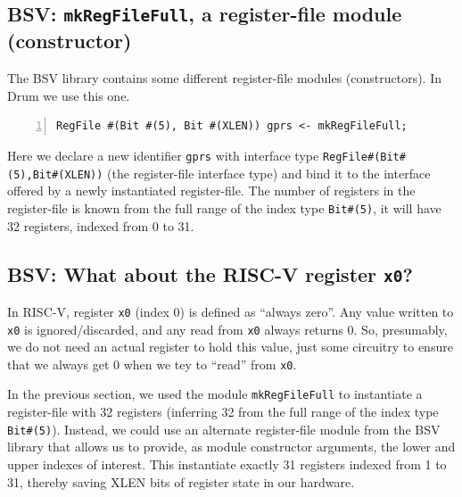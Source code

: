 
\subsection{BSV: {\tt mkRegFileFull}, a register-file module (constructor)}


The BSV library contains some different register-file modules
(constructors). In Drum we use this one.


\begin{Verbatim}[frame=single, numbers=left]
   RegFile #(Bit #(5), Bit #(XLEN)) gprs <- mkRegFileFull;
\end{Verbatim}

Here we declare a new identifier \verb|gprs| with interface type
\verb|RegFile#(Bit#(5),Bit#(XLEN))| (the register-file interface type)
and bind it to the interface offered by a newly instantiated
register-file.  The number of registers in the register-file is known
from the full range of the index type \verb|Bit#(5)|, {\ie} it will
have 32 registers, indexed from 0 to 31.


\subsection{BSV: What about the RISC-V register {\tt x0}?}


In RISC-V, register \verb|x0| (index 0) is defined as ``always zero''.
Any value written to \verb|x0| is ignored/discarded, and any read from
\verb|x0| always returns 0.  So, presumably, we do not need an actual
register to hold this value, just some circuitry to ensure that we
always get 0 when we tey to ``read'' from \verb|x0|.

In the previous section, we used the module \verb|mkRegFileFull| to
instantiate a register-file with 32 registers (inferring 32 from the
full range of the index type \verb|Bit#(5)|).  Instead, we could use
an alternate register-file module from the BSV library that allows us
to provide, as module constructor arguments, the lower and upper
indexes of interest.  This instantiate exactly 31 registers indexed
from 1 to 31, thereby saving XLEN bits of register state in our
hardware.

